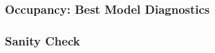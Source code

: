 \documentclass{beamer}
\begin{document}
    

\begin{frame}
\frametitle{Occupancy: Best Model Diagnostics}
    \begin{center}
        \noindent\centering
        \vspace{-0.7cm}
    \end{center}
\end{frame}

\begin{frame}
\frametitle{Sanity Check}
    \vspace{-0.35cm}
    \begin{center}
        
        \vspace{0.1cm} %
        

    \end{center}
\end{frame}
\end{document}
